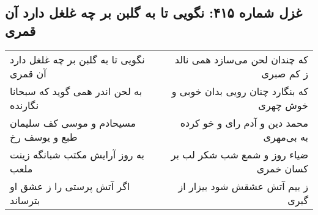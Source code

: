 \begin{center}
\section*{غزل شماره ۴۱۵: نگویی تا به گلبن بر چه غلغل دارد آن قمری}
\label{sec:415}
\begin{longtable}{l p{0.5cm} r}
نگویی تا به گلبن بر چه غلغل دارد آن قمری
&&
که چندان لحن می‌سازد همی نالد ز کم صبری
\\
به لحن اندر همی گوید که سبحانا نگارنده
&&
که بنگارد چنان رویی بدان خوبی و خوش چهری
\\
مسیحادم و موسی کف سلیمان طبع و یوسف رخ
&&
محمد دین و آدم رای و خو کرده به بی‌مهری
\\
به روز آرایش مکتب شبانگه زینت ملعب
&&
ضیاء روز و شمع شب شکر لب بر کسان خمری
\\
اگر آتش پرستی را ز عشق او بترساند
&&
ز بیم آتش عشقش شود بیزار از گبری
\\
\end{longtable}
\end{center}
